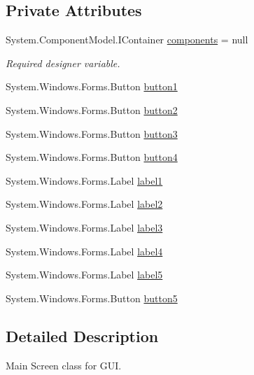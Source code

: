 \subsection*{Private Attributes}
\begin{DoxyCompactItemize}
\item 
System.\+Component\+Model.\+I\+Container \hyperlink{classPCO_1_1__0_1_1Form1_a614991e9397c076be2839e7021dc2f52}{components} = null
\begin{DoxyCompactList}\small\item\em Required designer variable. \end{DoxyCompactList}\item 
System.\+Windows.\+Forms.\+Button \hyperlink{classPCO_1_1__0_1_1Form1_af3e0364451a4d42b57d6e88d9b228b76}{button1}
\item 
System.\+Windows.\+Forms.\+Button \hyperlink{classPCO_1_1__0_1_1Form1_a7fae69d92446bd162912641481525170}{button2}
\item 
System.\+Windows.\+Forms.\+Button \hyperlink{classPCO_1_1__0_1_1Form1_a99473f0eda59346164d688a87a891ed1}{button3}
\item 
System.\+Windows.\+Forms.\+Button \hyperlink{classPCO_1_1__0_1_1Form1_a9ec1aecf37436e397b2812daad187c79}{button4}
\item 
System.\+Windows.\+Forms.\+Label \hyperlink{classPCO_1_1__0_1_1Form1_a7e49f562daa78670a4cc691f2f2cd311}{label1}
\item 
System.\+Windows.\+Forms.\+Label \hyperlink{classPCO_1_1__0_1_1Form1_a559c2f693a93d22068d3e3cbe02f9ff2}{label2}
\item 
System.\+Windows.\+Forms.\+Label \hyperlink{classPCO_1_1__0_1_1Form1_a10a68bb406aeae6edee2ebca3f3e2795}{label3}
\item 
System.\+Windows.\+Forms.\+Label \hyperlink{classPCO_1_1__0_1_1Form1_aa13c9160937ae7c6bd69f4cb984674e1}{label4}
\item 
System.\+Windows.\+Forms.\+Label \hyperlink{classPCO_1_1__0_1_1Form1_a617d8ed5e91d6d0827eff324fcf30292}{label5}
\item 
System.\+Windows.\+Forms.\+Button \hyperlink{classPCO_1_1__0_1_1Form1_a336a0f6934f9cb5f9d3fbb050849030f}{button5}
\end{DoxyCompactItemize}


\subsection{Detailed Description}
Main Screen class for G\+UI. 

